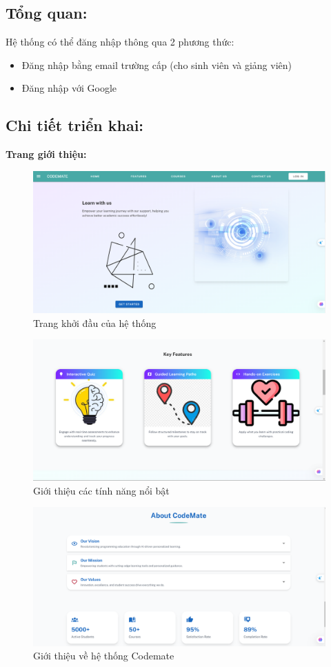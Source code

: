 \subsection{Tổng quan:}
Hệ thống có thể đăng nhập thông qua 2 phương thức:
\begin{itemize}
    \item Đăng nhập bằng email trường cấp (cho sinh viên và giảng viên)
    \item Đăng nhập với Google
\end{itemize}
\subsection{Chi tiết triển khai:}
\textbf{Trang giới thiệu:}
\begin{figure}[H]
        \centering
        \includegraphics[width=0.8\linewidth]{images/introduction.png}
        \caption{Trang khởi đầu của hệ thống}
        \label{fig:enter-label}
    \end{figure}
\begin{figure}[H]
        \centering
        \includegraphics[width=0.8\linewidth]{images/introduction_feature.png}
        \caption{Giới thiệu các tính năng nổi bật}
        \label{fig:enter-label}
    \end{figure}
    \begin{figure}[H]
        \centering
        \includegraphics[width=0.8\linewidth]{images/introduction_about.png}
        \caption{Giới thiệu về hệ thống Codemate}
        \label{fig:enter-label}
    \end{figure}
